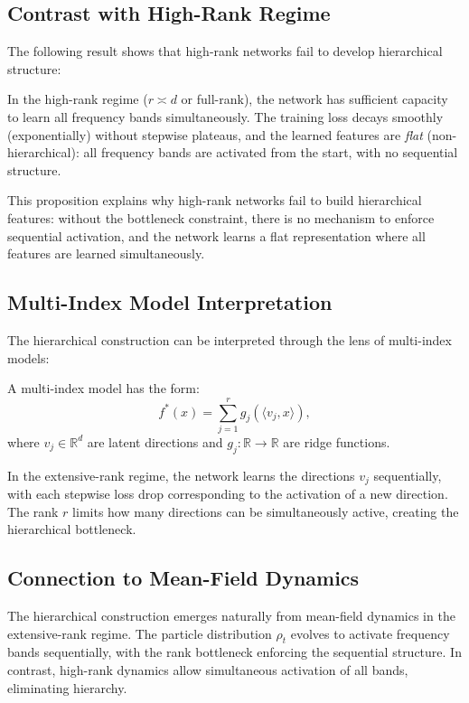 \subsection{Contrast with High-Rank Regime}

The following result shows that high-rank networks fail to develop hierarchical structure:

\begin{proposition}
\label{prop:high-rank-flat}
In the high-rank regime ($r \asymp d$ or full-rank), the network has sufficient capacity to learn all frequency bands simultaneously. The training loss decays smoothly (exponentially) without stepwise plateaus, and the learned features are \emph{flat} (non-hierarchical): all frequency bands are activated from the start, with no sequential structure.
\end{proposition}

This proposition explains why high-rank networks fail to build hierarchical features: without the bottleneck constraint, there is no mechanism to enforce sequential activation, and the network learns a flat representation where all features are learned simultaneously.

\subsection{Multi-Index Model Interpretation}

The hierarchical construction can be interpreted through the lens of multi-index models:

\begin{definition}
A multi-index model has the form:
\[
f^*(x) = \sum_{j=1}^r g_j(\langle v_j, x \rangle),
\]
where $v_j \in \mathbb{R}^d$ are latent directions and $g_j : \mathbb{R} \to \mathbb{R}$ are ridge functions.
\end{definition}

In the extensive-rank regime, the network learns the directions $v_j$ sequentially, with each stepwise loss drop corresponding to the activation of a new direction. The rank $r$ limits how many directions can be simultaneously active, creating the hierarchical bottleneck.

\subsection{Connection to Mean-Field Dynamics}

The hierarchical construction emerges naturally from mean-field dynamics in the extensive-rank regime. The particle distribution $\rho_t$ evolves to activate frequency bands sequentially, with the rank bottleneck enforcing the sequential structure. In contrast, high-rank dynamics allow simultaneous activation of all bands, eliminating hierarchy.
